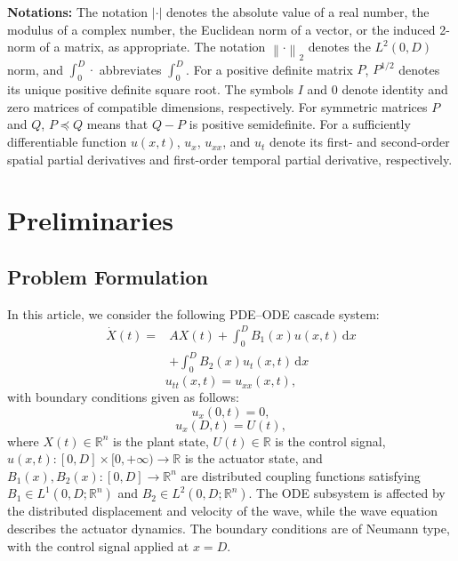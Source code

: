 \documentclass{IEEEtran}
\newcommand{\dint}[1]{\int_0^D #1}
\newcommand{\norm}[1]{\left\lVert #1 \right\rVert}
\newcommand{\abs}[1]{\left\lvert #1 \right\rvert}
\theoremstyle{definition}
\begin{document}
\textbf{Notations:}
The notation $\abs{\cdot}$ denotes the absolute value of a real number, the modulus of a complex number, the Euclidean norm of a vector, or the induced 2-norm of a matrix, as appropriate. The notation $\norm{\cdot}_2$ denotes the $L^2(0,D)$ norm, and $\dint{\cdot}$ abbreviates $\int_0^D$. For a positive definite matrix $P$, $P^{1/2}$ denotes its unique positive definite square root. The symbols $I$ and $0$ denote identity and zero matrices of compatible dimensions, respectively. For symmetric matrices $P$ and $Q$, $P\preceq Q$ means that $Q-P$ is positive semidefinite. For a sufficiently differentiable function $u(x,t)$, $u_x$, $u_{xx}$, and $u_t$ denote its first- and second-order spatial partial derivatives and first-order temporal partial derivative, respectively.


\section{Preliminaries}
\label{sec:prob}
\subsection{Problem Formulation}
In this article, we consider the following PDE--ODE cascade system:
\begin{equation}
\begin{aligned}
\dot{X}(t)={}&AX(t)
+\int_0^D B_1(x)u(x,t)\,\mathrm dx\\
&+\int_0^D B_2(x)u_t(x,t)\,\mathrm dx
\end{aligned}
\label{eq:ode}
\end{equation}
\begin{equation}
u_{tt}(x,t)=u_{xx}(x,t),
\label{eq:wave}
\end{equation}
with boundary conditions given as follows:
\begin{equation}
u_x(0,t)=0,
\label{eq:left_boundary}
\end{equation}
\begin{equation}
u_x(D,t)=U(t),
\label{eq:right_boundary}
\end{equation}
where $X(t)\in\mathbb{R}^n$ is the plant state,
$U(t)\in\mathbb{R}$ is the control signal,
$u(x,t):[0,D]\times[0,+\infty)\to\mathbb{R}$
is the actuator state, and
$B_1(x),B_2(x):[0,D]\to\mathbb{R}^n$
are distributed coupling functions satisfying
$B_1\in L^1(0,D;\mathbb R^n)$ and $B_2\in L^2(0,D;\mathbb R^n)$.
The ODE subsystem is affected by the distributed
displacement and velocity of the wave, while the
wave equation describes the actuator dynamics.
The boundary conditions are of Neumann type,
with the control signal applied at $x=D$.
\end{document}
